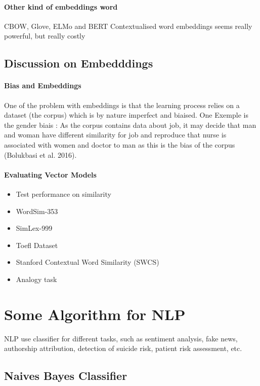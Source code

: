 			\paragraph*{Other kind of embeddings word}
				CBOW, Glove, ELMo and BERT
			Contextualised word embeddings seems really powerful, but really costly

			\subsection{Discussion on Embedddings}

				\paragraph*{Bias and Embeddings}
					One of the problem with embeddings is that the learning process relies on a dataset (the corpus) which is by nature imperfect and biaised. One Exemple is the gender biais : As the corpus contains data about job, it may decide that man and woman have different similarity for job and reproduce that nurse is associated with women and doctor to man as this is the bias of the corpus (Bolukbasi et al. 2016).

				\paragraph*{Evaluating Vector Models}
				\begin{itemize}
				  	\item Test performance on similarity
				  	\item WordSim-353
				  	\item SimLex-999
				  	\item Toefl Dataset
				  	\item Stanford Contextual Word Similarity (SWCS)
				  	\item Analogy task
				  \end{itemize}  


	\section{Some Algorithm for NLP}

		NLP use classifier for different tasks, such as sentiment analysis, fake news, authorship  attribution, detection of suicide risk, patient risk assessment, etc.

		\subsection{Naives Bayes Classifier}


